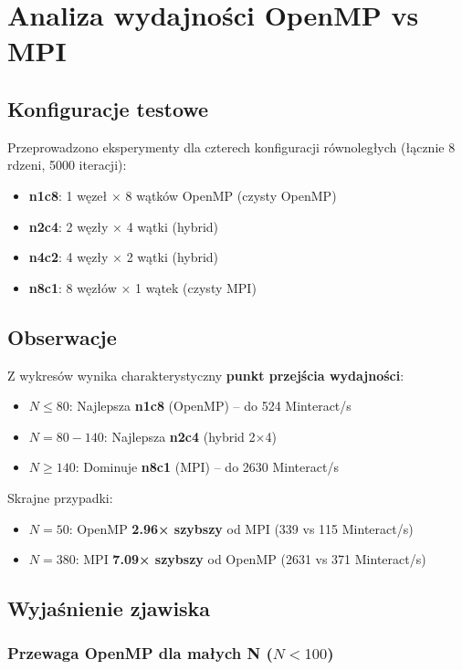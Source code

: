 \section{Analiza wydajności OpenMP vs MPI}

\subsection{Konfiguracje testowe}

Przeprowadzono eksperymenty dla czterech konfiguracji równoległych (łącznie 8 rdzeni, 5000 iteracji):
\begin{itemize}
    \item \textbf{n1c8}: 1 węzeł × 8 wątków OpenMP (czysty OpenMP)
    \item \textbf{n2c4}: 2 węzły × 4 wątki (hybrid)
    \item \textbf{n4c2}: 4 węzły × 2 wątki (hybrid)
    \item \textbf{n8c1}: 8 węzłów × 1 wątek (czysty MPI)
\end{itemize}

\subsection{Obserwacje}

Z wykresów wynika charakterystyczny \textbf{punkt przejścia wydajności}:
\begin{itemize}
    \item $N \leq 80$: Najlepsza \textbf{n1c8} (OpenMP) -- do 524 Minteract/s
    \item $N = 80-140$: Najlepsza \textbf{n2c4} (hybrid 2×4)
    \item $N \geq 140$: Dominuje \textbf{n8c1} (MPI) -- do 2630 Minteract/s
\end{itemize}

Skrajne przypadki:
\begin{itemize}
    \item $N=50$: OpenMP \textbf{2.96× szybszy} od MPI (339 vs 115 Minteract/s)
    \item $N=380$: MPI \textbf{7.09× szybszy} od OpenMP (2631 vs 371 Minteract/s)
\end{itemize}

\subsection{Wyjaśnienie zjawiska}

\subsubsection{Przewaga OpenMP dla małych N ($N < 100$)}

